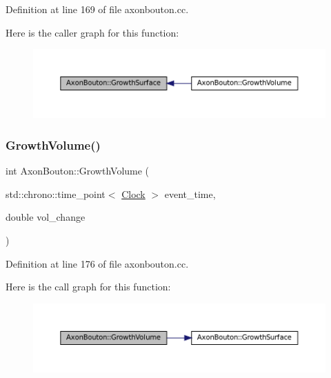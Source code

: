 Definition at line 169 of file axonbouton.\+cc.

Here is the caller graph for this function\+:\nopagebreak
\begin{figure}[H]
\begin{center}
\leavevmode
\includegraphics[width=350pt]{class_axon_bouton_a95fc006b2436e2c7784af2cc0bc9522e_icgraph}
\end{center}
\end{figure}
\mbox{\label{class_axon_bouton_a10ac4446e777376a3944c87b2bcf26b5}} 
\subsubsection{\texorpdfstring{Growth\+Volume()}{GrowthVolume()}}
{\footnotesize\ttfamily int Axon\+Bouton\+::\+Growth\+Volume (\begin{DoxyParamCaption}\item[{std\+::chrono\+::time\+\_\+point$<$ \mbox{\hyperlink{universe_8h_a0ef8d951d1ca5ab3cfaf7ab4c7a6fd80}{Clock}} $>$}]{event\+\_\+time,  }\item[{double}]{vol\+\_\+change }\end{DoxyParamCaption})}



Definition at line 176 of file axonbouton.\+cc.

Here is the call graph for this function\+:\nopagebreak
\begin{figure}[H]
\begin{center}
\leavevmode
\includegraphics[width=350pt]{class_axon_bouton_a10ac4446e777376a3944c87b2bcf26b5_cgraph}
\end{center}
\end{figure}
\mbox{\label{class_axon_bouton_a1f0b13fa7ec408c9e0cfb22cea9bbe8c}} 
